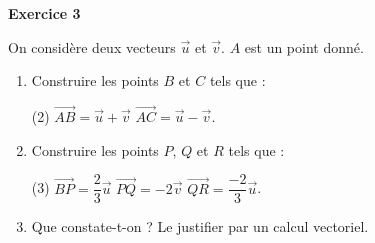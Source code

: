 \documentclass[a4paper,11pt]{article}
\newenvironment{exercice}[1]{%
  \par\bigskip\noindent\textbf{Exercice #1}\par\smallskip\noindent\ignorespaces
}{%
  \par
}
\begin{document}
\begin{exercice}{3}
On considère deux vecteurs $\vec u$ et $\vec v$. $A$ est un point donné.
\begin{enumerate}[label=\arabic*.]
\item Construire les points $B$ et $C$ tels que :
  \begin{tasks}[label=\textbullet](2)
  \task $\overrightarrow{AB}=\vec u+\vec v$
  \task $\overrightarrow{AC}=\vec u-\vec v$.
  \end{tasks}
\item Construire les points $P$, $Q$ et $R$ tels que :
  \begin{tasks}[label=\textbullet](3)
  \task $\overrightarrow{BP}=\dfrac23\vec u$
  \task $\overrightarrow{PQ}=-2\vec v$
  \task $\overrightarrow{QR}=\dfrac{-2}{3}\vec u$.
  \end{tasks}
\item Que constate-t-on ? Le justifier par un calcul vectoriel.
\end{enumerate}

\begin{center}
\end{center}
\end{exercice}
\end{document}
